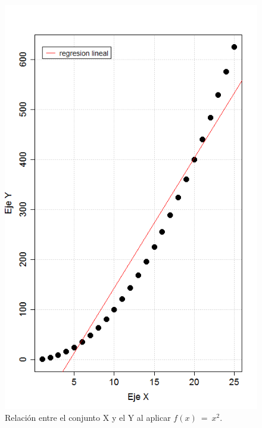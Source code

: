 \documentclass[]{article}
\begin{document}
\begin{figure}[bt!]
\centering \includegraphics[width=.7\linewidth]{Figuras/CorrelacionCurva.png}                 \caption{Relación entre el conjunto X y el Y al aplicar $f\left(x\right)\ =\ x^2$.}
\label{fig:Curva}
\end{figure}

\printbibliography[title={Referencias}]
\end{document}

